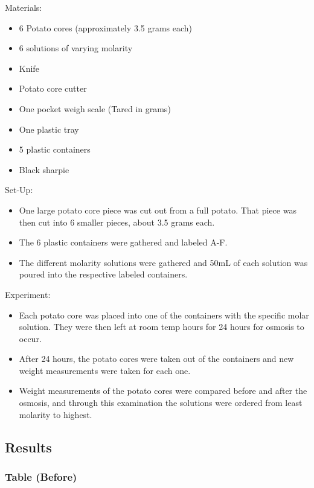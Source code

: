 \documentclass[letterpaper]{article}
\def\tightlist{}
\begin{document}
\begin{doublespace}
Materials:

\begin{itemize}
\tightlist
\item
  6 Potato cores (approximately 3.5 grams each)
\item
  6 solutions of varying molarity
\item
  Knife
\item
  Potato core cutter
\item
  One pocket weigh scale (Tared in grams)
\item
  One plastic tray
\item
  5 plastic containers
\item
  Black sharpie
\end{itemize}

Set-Up:

\begin{itemize}
\tightlist
\item
  One large potato core piece was cut out from a full potato. That piece was then cut into 6 smaller pieces, about 3.5 grams each.
\item
  The 6 plastic containers were gathered and labeled A-F.
\item
  The different molarity solutions were gathered and 50mL of each solution was poured into the respective labeled containers.
\end{itemize}

Experiment:

\begin{itemize}
\tightlist
\item
  Each potato core was placed into one of the containers with the specific molar solution. They were then left at room temp hours for 24 hours for osmosis to occur.
\item
  After 24 hours, the potato cores were taken out of the containers and new weight measurements were taken for each one.
\item
  Weight measurements of the potato cores were compared before and after the osmosis, and through this examination the solutions were ordered from least molarity to highest.
\end{itemize}

\subsection*{Results}\label{results}

\subsubsection*{Table (Before)}\label{table-before}


\end{doublespace}
\end{document}
